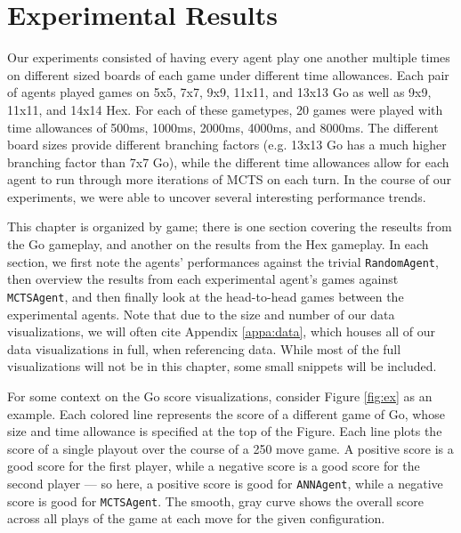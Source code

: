 %
%
%
\chapter{Experimental Results}\label{ch:implem}
Our experiments consisted of having every agent play one another multiple times on different sized boards of each game under different time allowances.  Each pair of agents played games on 5x5, 7x7, 9x9, 11x11, and 13x13 Go as well as 9x9, 11x11, and 14x14 Hex.  For each of these gametypes, 20 games were played with time allowances of 500ms, 1000ms, 2000ms, 4000ms, and 8000ms.  The different board sizes provide different branching factors (e.g. 13x13 Go has a much higher branching factor than 7x7 Go), while the different time allowances allow for each agent to run through more iterations of MCTS on each turn.  In the course of our experiments, we were able to uncover several interesting performance trends.

This chapter is organized by game; there is one section covering the reseults from the Go gameplay, and another on the results from the Hex gameplay.  In each section, we first note the agents' performances against the trivial \texttt{RandomAgent}, then overview the results from each experimental agent's games against \texttt{MCTSAgent}, and then finally look at the head-to-head games between the experimental agents.  Note that due to the size and number of our data visualizations, we will often cite Appendix \ref{appa:data}, which houses all of our data visualizations in full, when referencing data.  While most of the full visualizations will not be in this chapter, some small snippets will be included.  

For some context on the Go score visualizations, consider Figure \ref{fig:ex} as an example.  Each colored line represents the score of a different game of Go, whose size and time allowance is specified at the top of the Figure.  Each line plots the score of a single playout over the course of a 250 move game.  A positive score is a good score for the first player, while a negative score is a good score for the second player --- so here, a positive score is good for \texttt{ANNAgent}, while a negative score is good for \texttt{MCTSAgent}.  The smooth, gray curve shows the overall score across all plays of the game at each move for the given configuration.

